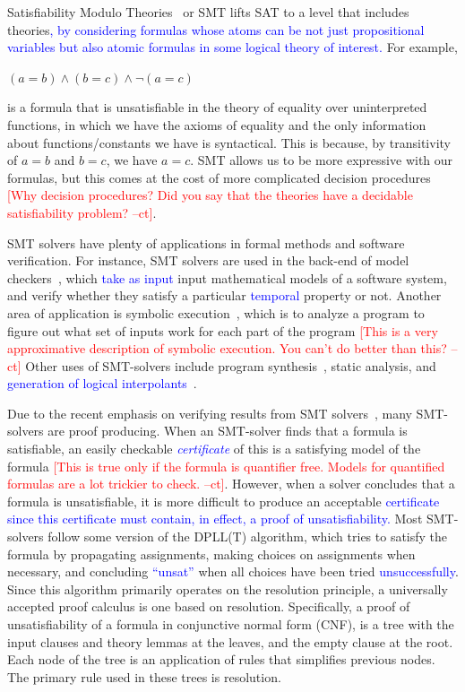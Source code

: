 \documentclass{article}
\newcommand{\rem}[1]{\textcolor{red}{[#1]}}
\newcommand{\ed}[1]{\textcolor{blue}{#1}}
\newcommand{\ct}[1]{\rem{#1 --ct}}
\begin{document}
	Satisfiability Modulo Theories~\cite{DBLP:reference/mc/BarrettT18} 
	or SMT lifts SAT to a level that includes theories\ed{,
	by considering formulas whose atoms can be not just propositional variables
	but also atomic formulas in some logical theory of interest.} 
	For example, 
	\begin{center} $(a = b) \land (b = c) \land \neg (a = c)$ 
	\end{center}
	is a formula that is unsatisfiable in the theory of 
	equality over uninterpreted functions, in which we have 
	the axioms of equality and the only information about
	functions/constants we have is syntactical. 
	This is because, by	transitivity of $a = b$ and $b = c$, 
	we have $a = c$. SMT 
	allows us to be more expressive with our formulas, but 
	this comes at the cost of more complicated decision 
	procedures
	\ct{Why decision procedures? Did you say that the theories have a decidable satisfiability problem?}.
	
	SMT solvers have plenty of applications in formal methods 
	and software verification. For instance, SMT solvers are used 
	in the back-end of model checkers~\cite{DBLP:books/daglib/0020348}, 
	which \ed{take as input} input mathematical 
	models of a software system, and verify whether they 
	satisfy a particular \ed{temporal} property or not. Another area of 
	application is symbolic
	execution~\cite{DBLP:journals/csur/BaldoniCDDF18}, 
	which is to analyze a 
	program to figure out what set of inputs work for each 
	part of the program \ct{This is a very approximative description of symbolic execution. You can't do better than this?}
	Other uses of SMT-solvers include 
	program synthesis~\cite{synth}, static analysis, 
	and \ed{generation of logical interpolants}~\cite{DBLP:journals/corr/abs-1111-5652}.
	
	Due to the recent emphasis on verifying results from SMT solvers~\cite{10.1145/1670412.1670413,
	mansur2020detecting, 10.1007/978-3-642-38916-0_3},
	many SMT-solvers are proof producing. When an SMT-solver finds 
	that a formula is satisfiable, an easily checkable \ed{\emph{certificate}} of this is 
	a satisfying model of the formula
	\ct{This is true only if the formula is quantifier free. 
	Models for quantified formulas are a lot trickier to check.
	}. 
	However, when a solver 
	concludes that a formula is unsatisfiable, it is more difficult 
	to produce an acceptable \ed{certificate since this certificate must 
	contain, in effect, a proof of unsatisfiability.} 
	Most SMT-solvers 
	follow some version of the DPLL(T) algorithm, which tries
	to satisfy the formula by propagating assignments, making 
	choices on assignments when necessary, and concluding \ed{``unsat''}
	when all choices have been tried \ed{unsuccessfully}. 
	Since this algorithm 
	primarily operates on the resolution principle, 
	a universally accepted proof calculus is one based 
	on resolution. Specifically, a proof of unsatisfiability 
	of a formula in conjunctive normal form (CNF), is a tree 
	with the input clauses and theory lemmas at the leaves, 
	and the empty clause at the root. Each node of the 
	tree is an application of rules that simplifies previous 
	nodes. The primary rule used in these trees is 
	resolution.
	
\end{document}
